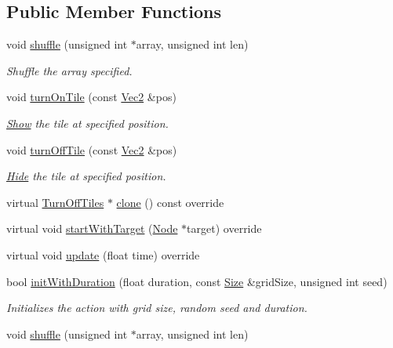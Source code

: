 \subsection*{Public Member Functions}
\begin{DoxyCompactItemize}
\item 
void \hyperlink{classTurnOffTiles_a83365793aa820835828c994fc0f5c0fa}{shuffle} (unsigned int $\ast$array, unsigned int len)
\begin{DoxyCompactList}\small\item\em Shuffle the array specified. \end{DoxyCompactList}\item 
void \hyperlink{classTurnOffTiles_a163856e08a10c7c6f5432c29d560f797}{turn\+On\+Tile} (const \hyperlink{classVec2}{Vec2} \&pos)
\begin{DoxyCompactList}\small\item\em \hyperlink{classShow}{Show} the tile at specified position. \end{DoxyCompactList}\item 
void \hyperlink{classTurnOffTiles_acf0d94735c46519fe4b301accd43a715}{turn\+Off\+Tile} (const \hyperlink{classVec2}{Vec2} \&pos)
\begin{DoxyCompactList}\small\item\em \hyperlink{classHide}{Hide} the tile at specified position. \end{DoxyCompactList}\item 
virtual \hyperlink{classTurnOffTiles}{Turn\+Off\+Tiles} $\ast$ \hyperlink{classTurnOffTiles_a8387f89056e2ec088e64d49d1701b2dc}{clone} () const override
\item 
virtual void \hyperlink{classTurnOffTiles_ac06cc826e738b0fe0df40fe554a00d45}{start\+With\+Target} (\hyperlink{classNode}{Node} $\ast$target) override
\item 
virtual void \hyperlink{classTurnOffTiles_a7388045e189c5831c6ebc4616f7ad752}{update} (float time) override
\item 
bool \hyperlink{classTurnOffTiles_a93d4217046be61a119760b1870840926}{init\+With\+Duration} (float duration, const \hyperlink{classSize}{Size} \&grid\+Size, unsigned int seed)
\begin{DoxyCompactList}\small\item\em Initializes the action with grid size, random seed and duration. \end{DoxyCompactList}\item 
void \hyperlink{classTurnOffTiles_a83365793aa820835828c994fc0f5c0fa}{shuffle} (unsigned int $\ast$array, unsigned int len)

\end{DoxyCompactItemize}
